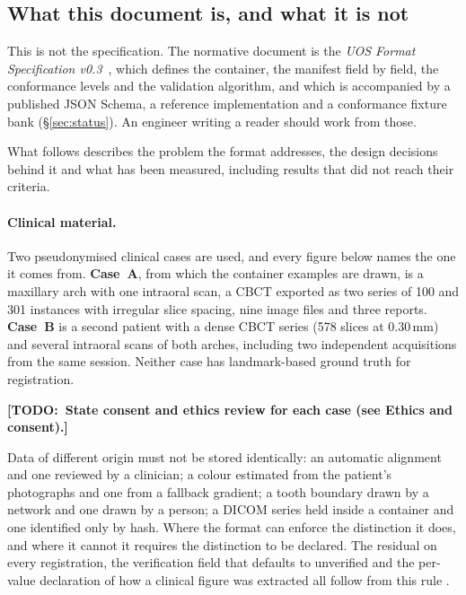 \documentclass[11pt,a4paper]{article}
\newif\iffinal \finalfalse
\newcommand{\todo}[1]{\iffinal\errmessage{Unresolved TODO left in the paper}\else
  {\color{red}\bfseries[TODO:~#1]}\fi}
\newenvironment{finding}[1]
 {\par\medskip\noindent{\color{uosblue}\rule{\linewidth}{0.9pt}}\par\nobreak\vspace{3pt}
  \noindent{\bfseries\color{uosblue}#1}\par\nobreak\vspace{2pt}}
 {\par\vspace{2pt}\noindent{\color{uosrule}\rule{\linewidth}{0.6pt}}\par\medskip}
\begin{document}
\subsection{What this document is, and what it is not}

This is not the specification. The normative document is the \emph{UOS Format Specification
v0.3}~\cite{uosspec}, which defines the container, the manifest field by field, the
conformance levels and the validation algorithm, and which is accompanied by a published
JSON Schema, a reference implementation and a conformance fixture bank (\S\ref{sec:status}).
An engineer writing a reader should work from those.

What follows describes the problem the format addresses, the design decisions behind it
and what has been measured, including results that did not reach their criteria.

\paragraph{Clinical material.} Two pseudonymised clinical cases are used, and every figure
below names the one it comes from. \textbf{Case~A}, from which the container examples are
drawn, is a maxillary arch with one intraoral scan, a CBCT exported as two series of 100 and
301 instances with irregular slice spacing, nine image files and three reports.
\textbf{Case~B} is a second patient with a dense CBCT series (578 slices at 0.30\,mm) and
several intraoral scans of both arches, including two independent acquisitions from the
same session. Neither case has landmark-based ground truth for registration.
\todo{State consent and ethics review for each case (see Ethics and consent).}

\begin{finding}{Design rule: distinguishable provenance}
Data of different origin must not be stored identically: an automatic alignment and one
reviewed by a clinician; a colour estimated from the patient's photographs and one from a
fallback gradient; a tooth boundary drawn by a network and one drawn by a person; a DICOM
series held inside a container and one identified only by hash. Where the format can enforce
the distinction it does, and where it cannot it requires the distinction to be declared. The
residual on every registration, the verification field that defaults to unverified and the
per-value declaration of how a clinical figure was extracted all follow from this rule
\cite{uosspec}.
\end{finding}
\end{document}
